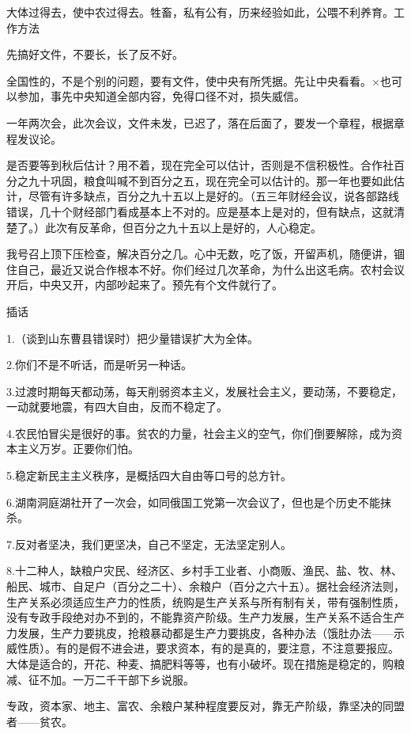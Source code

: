 大体过得去，使中农过得去。牲畜，私有公有，历来经验如此，公喂不利养育。工作方法

先搞好文件，不要长，长了反不好。

全国性的，不是个别的问题，要有文件，使中央有所凭据。先让中央看看。×也可以参加，事先中央知道全部内容，免得口径不对，损失威信。

一年两次会，此次会议，文件未发，已迟了，落在后面了，要发一个章程，根据章程发议论。

是否要等到秋后估计？用不着，现在完全可以估计，否则是不信积极性。合作社百分之九十巩固，粮食叫喊不到百分之五，现在完全可以估计的。那一年也要如此估计，尽管有许多缺点，百分之九十五以上是好的。（五三年财经会议，说各部路线错误，几十个财经部门看成基本上不对的。应是基本上是对的，但有缺点，这就清楚了。）此次有反革命，但百分之九十五以上是好的，人心稳定。

我号召上顶下压检查，解决百分之几。心中无数，吃了饭，开留声机，随便讲，锢住自己，最近又说合作根本不好。你们经过几次革命，为什么出这毛病。农村会议开后，中央又开，内部吵起来了。预先有个文件就行了。

插话

1.（谈到山东曹县错误时）把少量错误扩大为全体。

2.你们不是不听话，而是听另一种话。

3.过渡时期每天都动荡，每天削弱资本主义，发展社会主义，要动荡，不要稳定，一动就要地震，有四大自由，反而不稳定了。

4.农民怕冒尖是很好的事。贫农的力量，社会主义的空气，你们倒要解除，成为资本主义万岁。正要你们怕。

5.稳定新民主主义秩序，是概括四大自由等口号的总方针。

6.湖南洞庭湖社开了一次会，如同俄国工党第一次会议了，但也是个历史不能抹杀。

7.反对者坚决，我们更坚决，自己不坚定，无法坚定别人。

8.十二种人，缺粮户灾民、经济区、乡村手工业者、小商贩、渔民、盐、牧、林、船民、城市、自足户（百分之二十）、余粮户（百分之六十五）。据社会经济法则，生产关系必须适应生产力的性质，统购是生产关系与所有制有关，带有强制性质，没有专政手段绝对办不到的，不能靠资产阶级。生产力发展，生产关系不适合生产力发展，生产力要挑皮，抢粮暴动都是生产力要挑皮，各种办法（饿肚办法——示威性质）。有的是假不进会进，要求资本，有的是真的，要注意，不注意要报应。大体是适合的，开花、种麦、搞肥料等等，也有小破坏。现在措施是稳定的，购粮减、征不加。一万二千干部下乡说服。

专政，资本家、地主、富农、余粮户某种程度要反对，靠无产阶级，靠坚决的同盟者——贫农。

